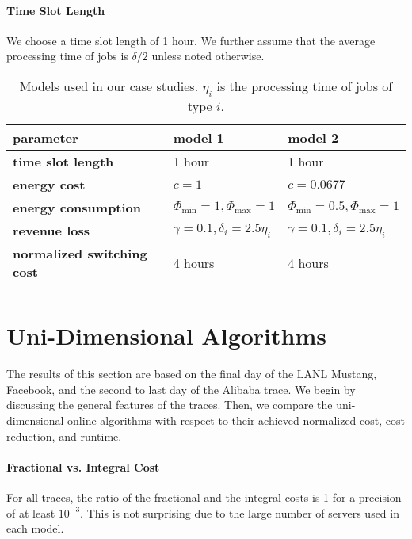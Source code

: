\paragraph{Time Slot Length} We choose a time slot length of 1 hour. We further assume that the average processing time of jobs is $\delta / 2$ unless noted otherwise.

\begin{table}
    \centering
    \begin{tabularx}{\textwidth}{>{\bfseries}l|X|X}
        parameter & model 1 & model 2 \\\hline
        time slot length & 1 hour & 1 hour \\
        energy cost & $c=1$ & $c=0.0677$ \\
        energy consumption & $\Phi_{\text{min}}=1, \Phi_{\text{max}}=1$ & $\Phi_{\text{min}}=0.5, \Phi_{\text{max}}=1$ \\
        revenue loss & $\gamma = 0.1, \delta_i = 2.5 \eta_i$ & $\gamma = 0.1, \delta_i = 2.5 \eta_i$ \\
        normalized switching cost & 4 hours & 4 hours \\
    \caption{Models used in our case studies. $\eta_i$ is the processing time of jobs of type $i$.}
    \end{tabularx}
    \label{tab:model}
\end{table}

\section{Uni-Dimensional Algorithms}

The results of this section are based on the final day of the LANL Mustang, Facebook, and the second to last day of the Alibaba trace. We begin by discussing the general features of the traces. Then, we compare the uni-dimensional online algorithms with respect to their achieved normalized cost, cost reduction, and runtime.

\paragraph{Fractional vs. Integral Cost} For all traces, the ratio of the fractional and the integral costs is 1 for a precision of at least $10^{-3}$. This is not surprising due to the large number of servers used in each model.

